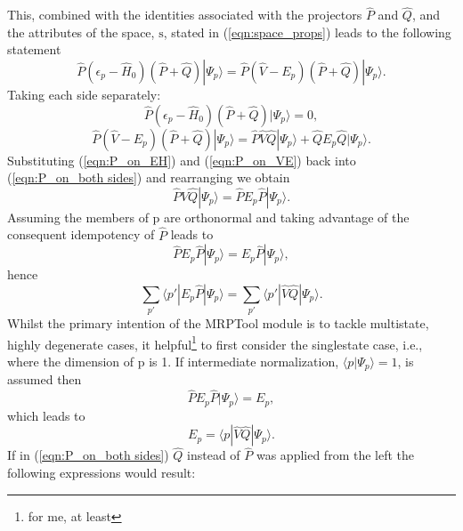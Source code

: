 \documentclass[12pt]{article}
\begin{document}
This, combined with the identities associated with the projectors $\hat{P}$ and $\hat{Q}$, and the
attributes of the space, $\mathrm{s}$, stated in (\ref{eqn:space_props}) leads to the following statement
\begin{equation}
\hat{P}(\epsilon_{p} - \hat{H}_{0})(\hat{P}+\hat{Q})| \Psi_{p} \rangle  =  \hat{P}(\hat{V}-E_{p})(\hat{P}+\hat{Q})|\Psi_{p} \rangle .
\label{eqn:P_on_both sides}
\end{equation}
Taking each side separately:
\begin{equation}
\hat{P}(\epsilon_{p} - \hat{H}_{0})(\hat{P}+\hat{Q})| \Psi_{p} \rangle  = 0  ,
\label{eqn:P_on_EH}
\end{equation}
\begin{equation}
\hat{P}(\hat{V}-E_{p})(\hat{P}+\hat{Q})|\Psi_{p} \rangle = \hat{P}\hat{V}\hat{Q}|\Psi_{p} \rangle + \hat{Q}E_{p}\hat{Q}|\Psi_{p}\rangle .
\label{eqn:P_on_VE}
\end{equation}
Substituting (\ref{eqn:P_on_EH}) and (\ref{eqn:P_on_VE}) back into (\ref{eqn:P_on_both sides}) and rearranging we obtain
\begin{equation}
\hat{P}\hat{V}\hat{Q}|\Psi_{p} \rangle =  \hat{P}E_{p}\hat{P}|\Psi_{p}\rangle .
\label{eqn:pt_energy}
\end{equation}
Assuming the members of $\mathrm{p}$ are orthonormal and taking advantage of the consequent idempotency of $\hat{P}$ leads to
\begin{equation}
\hat{P}E_{p}\hat{P}|\Psi_{p}\rangle = E_{p}\hat{P}|\Psi_{p} \rangle ,
\end{equation}
hence
\begin{equation}
\sum_{p'} \langle p' | E_{p}\hat{P}|\Psi_{p} \rangle  =  \sum_{p'} \langle p' | \hat{V}\hat{Q}|\Psi_{p} \rangle.
\label{eqn:multistate_pt_energy}
\end{equation}
Whilst the primary intention of the MRPTool module is to tackle multistate, highly degenerate cases, it helpful\footnote{for me, at least} 
to first consider the singlestate case, i.e., where the dimension of $\mathrm{p}$ is 1. 
If intermediate normalization, $\langle p | \Psi_{p} \rangle = 1$, is assumed then 
\begin{equation}
\hat{P}E_{p}\hat{P}|\Psi_{p}\rangle = E_{p},
\end{equation}
which leads to 
\begin{equation}
E_{p} = \langle p | \hat{V}\hat{Q}|\Psi_{p} \rangle.
\label{eqn:singlestate_pt_energy}
\end{equation}
If in (\ref{eqn:P_on_both sides}) $\hat{Q}$ instead of $\hat{P}$ was applied from the left the following expressions would result:
\end{document}
